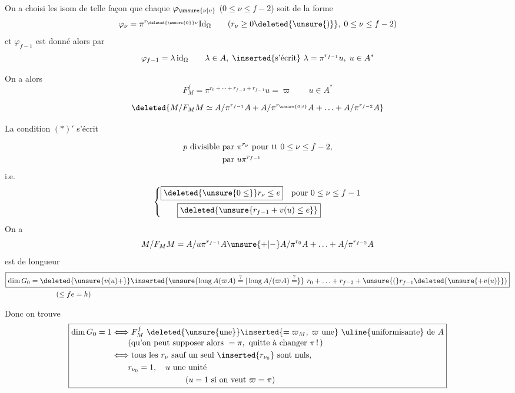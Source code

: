 
On a choisi les isom de telle façon que chaque $\varphi_{\unsure{\nu|v}}$ ($0\leq\nu\leq f-2$) soit de la forme
\[
\varphi_\nu=\pi^{r_{\deleted{\unsure{0}}\nu}}\mathrm{Id}_\Omega
\qquad (r_\nu\geq 0\deleted{\unsure{)}},\;0\leq\nu\leq f-2)
\]
et $\varphi_{f-1}$ est donné alors par
\[
\varphi_{f-1}=\lambda\,\mathrm{id}_\Omega \qquad \lambda\in A,\;\inserted{\text{s'écrit}}\ \lambda=\pi^{r_{f-1}}u,\;u\in A^*
\]

 On a alors
\[
F_M^f=\pi^{r_0+\cdots+r_{f-2}+r_{f-1}}u=\varpi\qquad u\in A^*
\]

\[
\deleted{M/F_M M\simeq A/\pi^{r_{f-1}}A+A/\pi^{r_{\unsure{0|i}}}A+\ldots+A/\pi^{r_{f-2}}A}
\]

La condition $(*)'$ s'écrit


\[
\begin{aligned}
&p\ \text{divisible par }\pi^{r_\nu}\ \text{pour tt }0\leq\nu\leq f-2,\\
&\hphantom{p\ \text{divisible }}\text{par }u\pi^{r_{f-1}}
\end{aligned}
\]
i.e.
\[
\left\{\begin{aligned}
&\boxed{\deleted{\unsure{0\leq}}r_\nu\leq e}\quad\text{pour }0\leq\nu\leq f-1\\
&\qquad\boxed{\deleted{\unsure{r_{f-1}+v(u)\leq e}}}
\end{aligned}\right.
\]
On a
\[
M/F_M M=A/u\pi^{r_{f-1}} A\unsure{+|-}A/\pi^{r_0}A+\ldots+A/\pi^{r_{f-2}}A
\]
est de  longueur
\[
\begin{aligned}
&\boxed{\dim G_0=\deleted{\unsure{v(u)+}} \inserted{\unsure{\operatorname{long} A(\varpi A)\mathrel{\overset{?}{=}}|\operatorname{long} A/(\varpi A)\mathrel{\overset{?}{=}}}}\ r_0+\ldots+r_{f-2}+\unsure{(}r_{f-1}\deleted{\unsure{+v(u)}})}\\
&\hspace{7em}(\leq fe=h)
\end{aligned}
\]


Donc on trouve
\[
\boxed{\begin{aligned}
\dim G_0=1&\Longleftrightarrow F_M^f\ \deleted{\unsure{\text{une}}}\inserted{=\varpi_M,\;\varpi\ \text{une}}\ \text{\uline{uniformisante} de }A\\[-2pt]
&\qquad\text{(qu'on peut supposer alors }=\pi,\ \text{quitte à changer }\pi\,!\,)\\
&\Longleftrightarrow\text{tous les }r_\nu\text{ sauf un seul }\inserted{r_{\nu_0}}\text{ sont nuls},\\
&\qquad r_{\nu_0}=1,\quad u\text{ une unité}\\
&\hspace{9em}(u=1\text{ si on veut }\varpi=\pi)
\end{aligned}}
\]

